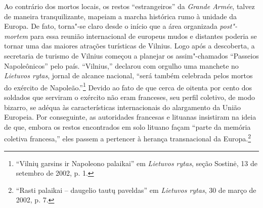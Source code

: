 Ao contrário dos mortos locais, os restos ``estrangeiros'' da
\textit{Grande Armée}, talvez de maneira tranquilizante, mapeiam a marcha
histórica rumo à unidade da Europa. De fato, torna"-se claro desde o
início que a área organizada \textit{post"-mortem} para essa reunião
internacional de europeus mudos e distantes poderia se tornar uma das
maiores atrações turísticas de Vilnius. Logo após a descoberta, a
secretaria de turismo de Vilnius começou a planejar os assim"-chamados
``Passeios Napoleônicos'' pelo país. ``Vilnius,'' declarou com orgulho
uma manchete no \textit{Lietuvos rytas}, jornal de alcance nacional,
``será também celebrada pelos mortos do exército de
Napoleão.''\footnote{``Vilnių garsins ir Napoleono palaikai'' em \textit{Lietuvos rytas}, seção Sostinė, 13 de setembro de 2002, p. 1.} Devido ao fato de que cerca de oitenta por cento dos soldados que
serviram o exército não eram franceses, seu perfil coletivo, de modo
bizarro, se adéqua às características internacionais do alargamento da
União Europeia. Por conseguinte, as autoridades francesas e lituanas
insistiram na ideia de que, embora os restos encontrados em solo lituano
façam ``parte da memória coletiva francesa,'' eles passem a pertencer à
herança transnacional da Europa.\footnote{``Rasti palaikai -- daugelio tautų paveldas'' em \textit{Lietuvos rytas}, 30 de março de 2002, p. 7.}

